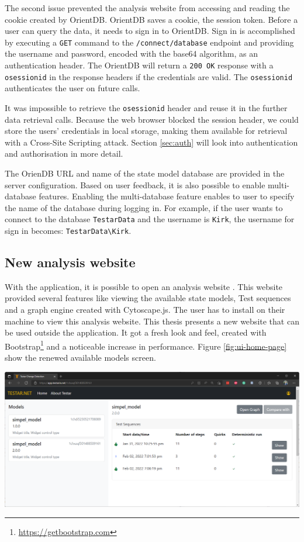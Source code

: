 The second issue prevented the analysis website from accessing and reading the cookie created by OrientDB. OrientDB saves a cookie, the session token. Before a user can query the data, it needs to sign in to OrientDB. Sign in is accomplished by executing a \verb|GET| command to the \verb|/connect/database| endpoint and providing the username and password, encoded with the base64 algorithm, as an authentication header. The OrientDB will return a \verb|200 OK| response with a \verb|osessionid| in the response headers if the credentials are valid. The \verb|osessionid| authenticates the user on future calls.

It was impossible to retrieve the \verb|osessionid| header and reuse it in the further data retrieval calls. Because the web browser blocked the session header, we could store the users' credentials in local storage, making them available for retrieval with a Cross-Site Scripting attack. Section \ref{sec:auth} will look into authentication and authorisation in more detail.

The OrienDB URL and name of the \testar state model database are provided in the server configuration. Based on user feedback, it is also possible to enable multi-database features. Enabling the multi-database feature enables to user to specify the name of the database during logging in. For example, if the user wants to connect to the database \verb|TestarData| and the username is \verb|Kirk|, the username for sign in becomes: \verb|TestarData\Kirk|.

\subsection{New \testar analysis website}
With the \testar application, it is possible to open an analysis website \cite{thesisMulders}. This website provided several features like viewing the available state models, Test sequences and a graph engine created with Cytoscape.js. The user has to install \testar on their machine to view this analysis website. This thesis presents a new website that can be used outside the \testar application. It got a fresh look and feel, created with Bootstrap\footnote{\url{https://getbootstrap.com}} and a noticeable increase in performance. Figure \ref{fig:ui-home-page} show the renewed available models screen. 

\newpage
\begingroup
\captionsetup{type=figure}
\includegraphics[scale=0.4]{images/ui-home-page.png}
\label{fig:ui-home-page}
\endgroup


